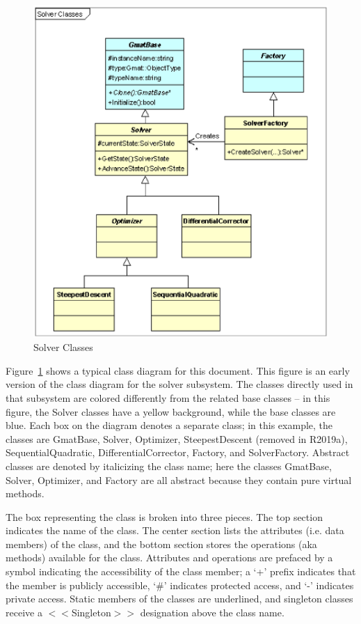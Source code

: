 \begin{figure}[htb!]
\begin{center}
\includegraphics[scale=0.5]{Images/UmlClassSample.eps}
\caption{\label{figure:UmlClassExample}Solver Classes}
\end{center}
\end{figure}

Figure~\ref{figure:UmlClassExample} shows a typical class diagram for this document.  This figure is
an early version of the class diagram for the solver subsystem.  The classes directly used in that
subsystem are colored differently from the related base classes -- in this figure, the Solver
classes have a yellow background, while the base classes are blue.  Each box on the diagram denotes
a separate class; in this example, the classes are GmatBase, Solver, Optimizer, SteepestDescent (removed in R2019a),
SequentialQuadratic, DifferentialCorrector, Factory, and SolverFactory.  Abstract classes are
denoted by italicizing the class name; here the classes GmatBase, Solver, Optimizer, and Factory are
all abstract because they contain pure virtual methods.

The box representing the class is broken into three pieces.  The top section indicates the name of
the class.  The center section lists the attributes (i.e. data members) of the class, and the bottom
section stores the operations (aka methods) available for the class.  Attributes and operations are
prefaced by a symbol indicating the accessibility of the class member; a `+' prefix indicates that
the member is publicly accessible, `\#' indicates protected access, and `-' indicates private
access.  Static members of the classes are underlined, and singleton classes receive a
$<<$Singleton$>>$ designation above the class name.

